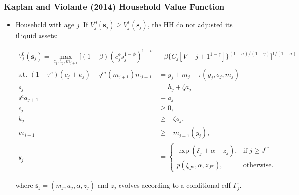 \documentclass{beamer}
\begin{document}
\begin{frame}
\frametitle{Kaplan and Violante (2014) Household Value Function}


\begin{itemize}[<+->]

\item Household with age $j$. If $V_j^0(\mathbf{s}_j) \ge V_j^1(\mathbf{s}_j)$, the HH do not adjusted its illiquid assets:

\scriptsize

\begin{align*}
V_j^0(\mathbf{s}_j) =\max_{c_j, h_j, m_{j+1}}[(1-\beta) (c_j^\phi s_j^{1-\phi})^{1-\sigma} &+ \beta\{C_j[V-{j+1}^{1-\gamma}]\}^{(1-\sigma)/(1-\gamma)}]^{1/(1-\sigma)}\\
\text{s.t. }
(1+\tau^c)(c_j + h_j) + q^m(m_{j+1}) m_{j+1} &= y_j + m_j - \tau(y_j, a_j, m_j)\\
s_j &= h_j + \zeta a_j\\
q^a a_{j+1} &= a_j\\
c_j &\ge 0, \\
h_j &\ge - \zeta a_j, \\
m_{j+1} &\ge - \underline{m}_{j+1}(y_j),\\
y_j &= \begin{cases}
\exp(\xi_j + \alpha + z_j), &\text{if } j \ge J^w\\
p(\xi_{J^w}, \alpha, z_{J^w}), &\text{otherwise.}
\end{cases}
\end{align*}

\normalsize

where $\mathbf{s}_j = (m_j, a_j, \alpha, z_j)$ and $z_j$  evolves according to a conditional cdf $\Gamma_j^z$.

\end{itemize}

\end{frame}
\end{document}
